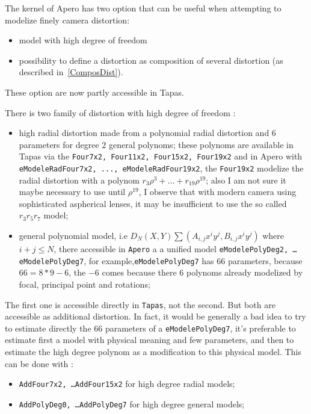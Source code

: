 The kernel of Apero has two option that can be useful when attempting to modelize finely camera distortion:

\begin{itemize}
   \item model with high degree of freedom
   \item possibility to define a distortion as composition of several distortion (as described in~\ref{ComposDist}).
\end{itemize}

These option are now partly accessible in Tapas.

There is two family of distortion with high degree of freedom :


\begin{itemize}
   \item high radial distortion made from a polynomial radial distortion and $6$ parameters for degree $2$
         general polynoms; these polynoms are available in Tapas via the {\tt Four7x2, Four11x2, Four15x2, Four19x2}
         and in Apero with {\tt eModeleRadFour7x2, ..., eModeleRadFour19x2}, the {\tt Four19x2} modelize the radial
         distortion with a polynom $r_3 \rho^3 +\dots + r_{19} \rho^{19}$; also I am not sure it maybe necessary to
         use until $ \rho^{19}$, I observe that with modern camera using sophisticated aspherical lenses, it may be
         insufficient to use the so called $r_3 r_5 r_7$ model;


   \item general polynomial model, i.e $D_N(X,Y) \sum (A_{i,j} x^iy^j,B_{i,j} x^iy^j)$  where $i+j\leq N$,
         there accessible in {\tt Apero} a a unified model {\tt eModelePolyDeg2, \dots eModelePolyDeg7},
         for example,{\tt eModelePolyDeg7} has $66$ parameters, because $66=8*9-6$, the $-6$ comes because
         there $6$ polynoms already modelized by focal, principal point and rotations;
\end{itemize}

The first one is accessible directly in {\tt Tapas}, not the second. But both are accessible as additional distortion.
In fact, it would be generally a bad idea to try to estimate directly the $66$ parameters of a {\tt eModelePolyDeg7}, it's
preferable to estimate first a model with physical meaning and few parameters, and then to estimate the high degree polynom as a modification to this physical model. This can be done with :

\begin{itemize}
    \item  {\tt AddFour7x2,  \dots AddFour15x2} for high degree radial models;
    \item  {\tt AddPolyDeg0, \dots AddPolyDeg7} for high degree general models;
\end{itemize}

